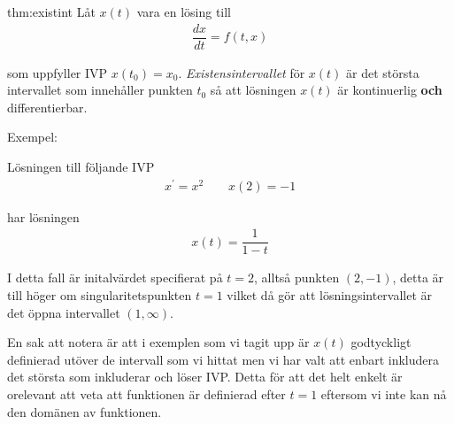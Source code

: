 \begin{theo}[Existensintervall]{thm:existint}
  Låt $x(t)$ vara en lösing till
  \begin{equation*}
    \begin{gathered}
      \dfrac{dx}{dt}=f(t,x)
    \end{gathered}
  \end{equation*}\par
  \noindent som uppfyller IVP $x(t_0)=x_0$. \textit{Existensintervallet} för $x(t)$ är det största intervallet som innehåller punkten $t_0$ så att lösningen $x(t)$ är kontinuerlig \textbf{och} differentierbar. 
\end{theo}
\par\bigskip
\noindent Exempel:\par
\noindent Lösningen till följande IVP
\begin{equation*}
  \begin{gathered}
    x^{\prime} = x^2 \qquad x(2)=-1
  \end{gathered}
\end{equation*}\par
\noindent har lösningen
\begin{equation*}
  \begin{gathered}
    x(t) = \dfrac{1}{1-t}
  \end{gathered}
\end{equation*}\par
\noindent I detta fall är initalvärdet specifierat på $t=2$, alltså punkten $(2, -1)$, detta är till höger om singularitetspunkten $t=1$ vilket då gör att lösningsintervallet är det öppna intervallet $(1, \infty)$.
\par\bigskip
\noindent En sak att notera är att i exemplen som vi tagit upp är $x(t)$ godtyckligt definierad utöver de intervall som vi hittat men vi har valt att enbart inkludera det största som inkluderar och löser IVP. Detta för att det helt enkelt är orelevant att veta att funktionen är definierad efter $t=1$ eftersom vi inte kan nå den domänen av funktionen. 
